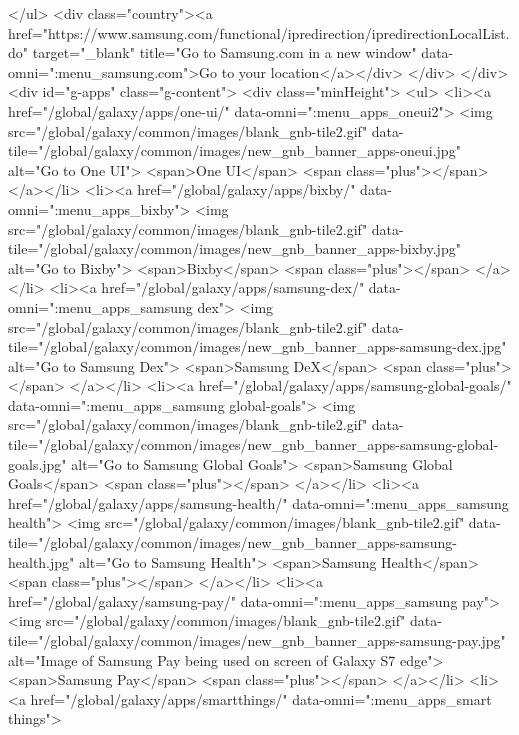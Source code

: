 						</ul>
						<div class="country"><a href="https://www.samsung.com/functional/ipredirection/ipredirectionLocalList.do" target="_blank" title="Go to Samsung.com in a new window" data-omni=":menu_samsung.com">Go to your location</a></div>
					</div>
				</div>
				<div id="g-apps" class="g-content">
					<div class="minHeight">
						<ul>
							<li><a href="/global/galaxy/apps/one-ui/" data-omni=":menu_apps_oneui2">
								<img src="/global/galaxy/common/images/blank_gnb-tile2.gif"
									data-tile="/global/galaxy/common/images/new_gnb_banner_apps-oneui.jpg"
									alt="Go to One UI">
								<span>One UI</span>
								<span class="plus"></span>
							</a></li>
							<li><a href="/global/galaxy/apps/bixby/" data-omni=":menu_apps_bixby">
								<img src="/global/galaxy/common/images/blank_gnb-tile2.gif"
									data-tile="/global/galaxy/common/images/new_gnb_banner_apps-bixby.jpg"
									alt="Go to Bixby">
								<span>Bixby</span>
								<span class="plus"></span>
							</a></li>
							<li><a href="/global/galaxy/apps/samsung-dex/" data-omni=":menu_apps_samsung dex">
								<img src="/global/galaxy/common/images/blank_gnb-tile2.gif"
									data-tile="/global/galaxy/common/images/new_gnb_banner_apps-samsung-dex.jpg"
									alt="Go to Samsung Dex">
								<span>Samsung DeX</span>
								<span class="plus"></span>
							</a></li>
							<li><a href="/global/galaxy/apps/samsung-global-goals/" data-omni=":menu_apps_samsung global-goals">
								<img src="/global/galaxy/common/images/blank_gnb-tile2.gif"
									data-tile="/global/galaxy/common/images/new_gnb_banner_apps-samsung-global-goals.jpg"
									alt="Go to Samsung Global Goals">
								<span>Samsung Global Goals</span>
								<span class="plus"></span>
							</a></li>
							<li><a href="/global/galaxy/apps/samsung-health/" data-omni=":menu_apps_samsung health">
								<img src="/global/galaxy/common/images/blank_gnb-tile2.gif"
									data-tile="/global/galaxy/common/images/new_gnb_banner_apps-samsung-health.jpg"
									alt="Go to Samsung Health">
								<span>Samsung Health</span>
								<span class="plus"></span>
							</a></li>
							<li><a href="/global/galaxy/samsung-pay/" data-omni=":menu_apps_samsung pay">
								<img src="/global/galaxy/common/images/blank_gnb-tile2.gif"
									data-tile="/global/galaxy/common/images/new_gnb_banner_apps-samsung-pay.jpg"
									alt="Image of Samsung Pay being used on screen of Galaxy S7 edge">
								<span>Samsung Pay</span>
								<span class="plus"></span>
							</a></li>
							<li><a href="/global/galaxy/apps/smartthings/" data-omni=":menu_apps_smart things">
